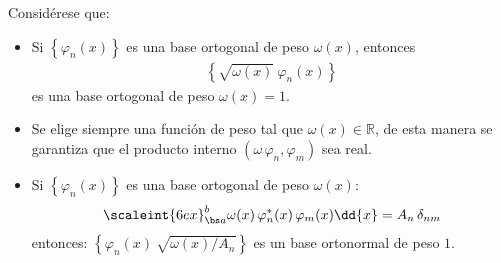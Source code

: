 \vfill{}
Considérese que:
\begin{itemize}
\item Si $\left\{ \varphi_{n} (x) \right\}$ es una base ortogonal de peso $\omega (x)$, entonces 
\begin{align*}
\left\{ \sqrt{\omega (x)} \: \varphi_{n} (x) \right\}
\end{align*}
es una base ortogonal de peso $\omega (x) = 1$.
\item Se elige siempre una función de peso tal que $\omega (x) \in \mathbb{R}$, de esta manera se garantiza que el producto interno $(\omega \, \varphi_{n}, \varphi_{m})$ sea real.
\item Si $\left\{ \varphi_{n} (x) \right\}$ es una base ortogonal de peso $\omega (x)$:
\begin{align*}
\scaleint{6ex}_{\bs a}^{b} \omega (x) \, \varphi_{n}^{*} (x) \, \varphi_{m} (x) \dd{x} = A_{n} \, \delta_{nm}
\end{align*}
entonces: $\left\{ \varphi_{n} (x) \: \sqrt{\omega (x) / A_{n}} \right\}$ es un base ortonormal de peso $1$.
\end{itemize}

